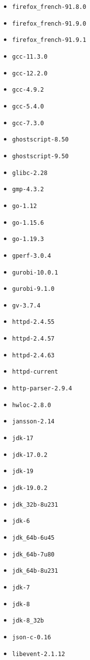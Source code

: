 \begin{multicols}{3}
\begin{itemize}
\item \verb|firefox_french-91.8.0|
\item \verb|firefox_french-91.9.0|
\item \verb|firefox_french-91.9.1|
\item \verb|gcc-11.3.0|
\item \verb|gcc-12.2.0|
\item \verb|gcc-4.9.2|
\item \verb|gcc-5.4.0|
\item \verb|gcc-7.3.0|
\item \verb|ghostscript-8.50|
\item \verb|ghostscript-9.50|
\item \verb|glibc-2.28|
\item \verb|gmp-4.3.2|
\item \verb|go-1.12|
\item \verb|go-1.15.6|
\item \verb|go-1.19.3|
\item \verb|gperf-3.0.4|
\item \verb|gurobi-10.0.1|
\item \verb|gurobi-9.1.0|
\item \verb|gv-3.7.4|
\item \verb|httpd-2.4.55|
\item \verb|httpd-2.4.57|
\item \verb|httpd-2.4.63|
\item \verb|httpd-current|
\item \verb|http-parser-2.9.4|
\item \verb|hwloc-2.8.0|
\item \verb|jansson-2.14|
\item \verb|jdk-17|
\item \verb|jdk-17.0.2|
\item \verb|jdk-19|
\item \verb|jdk-19.0.2|
\item \verb|jdk_32b-8u231|
\item \verb|jdk-6|
\item \verb|jdk_64b-6u45|
\item \verb|jdk_64b-7u80|
\item \verb|jdk_64b-8u231|
\item \verb|jdk-7|
\item \verb|jdk-8|
\item \verb|jdk-8_32b|
\item \verb|json-c-0.16|
\item \verb|libevent-2.1.12|

\end{itemize}
\end{multicols}
